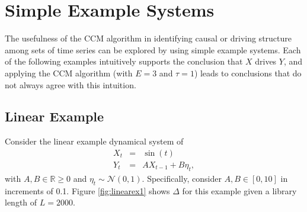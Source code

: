 \documentclass[a4paper,11pt,twocolumn]{article}
\begin{document}
\section{Simple Example Systems}
The usefulness of the CCM algorithm in identifying causal or driving structure among sets of time series can be explored by using simple example systems.  Each of the following examples intuitively supports the conclusion that $X$ drives $Y$, and applying the CCM algorithm (with $E=3$ and $\tau=1$) leads to conclusions that do not always agree with this intuition.

\subsection{Linear Example}
Consider the linear example dynamical system of
\begin{eqnarray}
\label{eq:linearex}
X_t &=& \sin(t)\\
Y_t &=& AX_{t-1}+B\eta_t,
\end{eqnarray}
with $A,B\in\mathbb{R}\ge 0$ and $\eta_t\sim\mathcal{N}\left(0,1\right)$.  Specifically, consider $A,B\in[0,10]$ in increments of 0.1.  Figure \ref{fig:linearex1} shows $\Delta$ for this example given a library length of $L=2000$.
\end{document}

